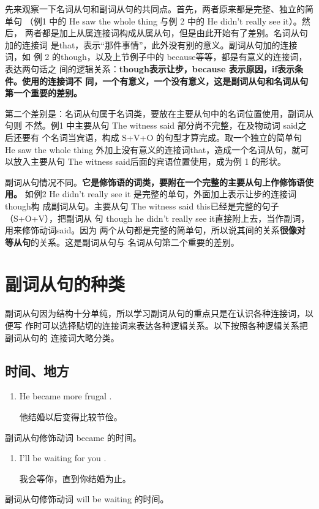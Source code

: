 先来观察一下名词从句和副词从句的共同点。首先，两者原来都是完整、独立的简单句
（例1 中的 He saw the whole thing 与例 2 中的 He didn't really see it）。然后，
两者都是加上从属连接词构成从属从句，但是由此开始有了差别。名词从句加的连接词
是that，表示“那件事情”，此外没有别的意义。副词从句加的连接词，如
例 2 的though，以及上节例子中的 because等等，都是有意义的连接词，表达两句话之
间的逻辑关系：\textbf{though表示让步，because 表示原因，if表示条件。使用的连接词不
同，一个有意义，一个没有意义，这是副词从句和名词从句第一个重要的差别。}

第二个差别是：名词从句属于名词类，要放在主要从句中的名词位置使用，副词从句则
不然。例1 中主要从句 The witness said 部分尚不完整，在及物动词 said之后还要有
个名词当宾语，构成 S+V+O 的句型才算完成。取一个独立的简单句 He saw the whole
thing 外加上没有意义的连接词that，造成一个名词从句，就可以放入主要从句 The
witness said后面的宾语位置使用，成为例 1 的形状。

副词从句情况不同。\textbf{它是修饰语的词类，要附在一个完整的主要从句上作修饰语使用。}
如例2 He didn't really see it 是完整的单句，外面加上表示让步的连接词 though构
成副词从句。主要从句 The witness said this已经是完整的句子（S+O+V），把副词从
句 though he didn't really see it直接附上去，当作副词，用来修饰动词said。因为
两个从句都是完整的简单句，所以说其间的关系\textbf{很像对等从句}的关系。这是副词从句与
名词从句第二个重要的差别。

\section{副词从句的种类}

副词从句因为结构十分单纯，所以学习副词从句的重点只是在认识各种连接词，以便写
作时可以选择贴切的连接词来表达各种逻辑关系。以下按照各种逻辑关系把副词从句的
连接词大略分类。

\subsection{时间、地方}

\begin{enumerate}
\item He became more frugal  .

  他结婚以后变得比较节俭。
\end{enumerate}
副词从句修饰动词 became 的时间。

\begin{enumerate}[resume]
\item I'll be waiting for you  .

  我会等你，直到你结婚为止。
\end{enumerate}
副词从句修饰动词 will be waiting 的时间。

